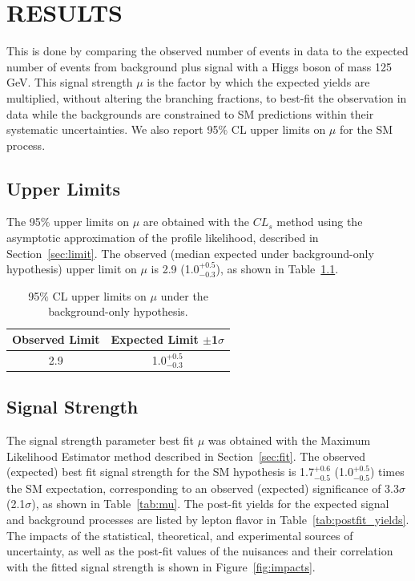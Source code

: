 %
%

\chapter{RESULTS}
\label{chap:results}

This is done by comparing the observed number of events in data to the expected number of events from background plus \tth signal with a Higgs boson of mass 125 GeV. 
This signal strength $\mu$ is the factor by which the expected \tth yields are multiplied, without altering the branching fractions, to best-fit the observation in data
while the backgrounds are constrained to SM predictions within their systematic uncertainties. We also report 95$\%$ CL upper limits on $\mu$ for the SM \tth process.

\section{Upper Limits}
The 95$\%$ upper limits on $\mu$ are obtained with the $CL_{s}$ method using the asymptotic approximation of the profile likelihood, described in Section~\ref{sec:limit}.
The observed (median expected under background-only hypothesis) upper limit on $\mu$ is 2.9 (1.0$^{+0.5}_{-0.3}$), as shown in Table~\ref{tab:limits}.

\begin{table}[htbp]
\begin{center}
  \caption[Table of Final Limits]{95$\%$ CL upper limits on $\mu$ under the background-only hypothesis.}
    \begin{tabular}{c c} \hline
      Observed Limit & Expected Limit $\pm$1$\sigma$  \\ \hline 
      2.9 & 1.0$^{+0.5}_{-0.3}$  \\
      \hline
    \end{tabular}
    \label{tab:limits}
\end{center}
\end{table}

\section{Signal Strength}
The signal strength parameter best fit $\mu$ was obtained with the Maximum Likelihood Estimator method described in Section~\ref{sec:fit}.
The observed (expected) best fit signal strength for the SM \tth hypothesis is 1.7$^{+0.6}_{-0.5}$ (1.0$^{+0.5}_{-0.5}$) times the SM expectation,
corresponding to an observed (expected) significance of 3.3$\sigma$ (2.1$\sigma$), as shown in Table~\ref{tab:mu}.
The post-fit yields for the expected signal and background processes are listed by lepton flavor in Table~\ref{tab:postfit_yields}.
The impacts of the statistical, theoretical, and experimental sources of uncertainty, as well as the post-fit values of the nuisances and their correlation with
the fitted signal strength is shown in Figure~\ref{fig:impacts}.

